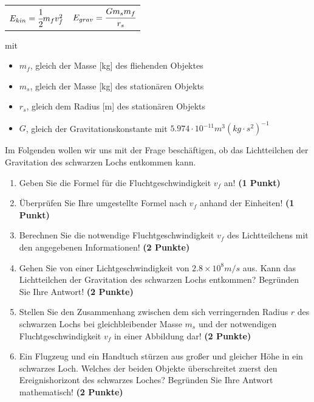\documentclass[a4paper, 9pt]{scrartcl}\usepackage[]{graphicx}\usepackage[]{xcolor}
\begin{document}
\begin{center}
  \begin{tabular}{cc}
    $E_{kin} = \cfrac{1}{2}m_fv_f^2$ & $E_{grav} = \cfrac{Gm_sm_f}{r_s}$\\
  \end{tabular}
\end{center}

mit

\begin{itemize}[noitemsep]
\item $m_f$, gleich der Masse [kg] des fliehenden Objektes
\item $m_s$, gleich der Masse [kg] des station{\"a}ren Objekts
\item $r_s$, gleich dem Radius [m] des station{\"a}ren Objekts  
\item $G$, gleich der Gravitationskonstante mit $5.974 \cdot 10^{-11}
  m^3(kg \cdot s^2)^{-1}$ 
\end{itemize}

Im Folgenden wollen wir uns mit der Frage besch{\"a}ftigen, ob das
Lichtteilchen der Gravitation des schwarzen Lochs entkommen kann.

\begin{enumerate}
\item Geben Sie die Formel f{\"u}r die Fluchtgeschwindigkeit $v_f$ an! 
  \textbf{(1 Punkt)}
\item {\"U}berpr{\"u}fen Sie Ihre umgestellte Formel nach $v_f$ anhand der Einheiten!
  \textbf{(1 Punkt)} 
\item Berechnen Sie die notwendige Fluchtgeschwindigkeit $v_f$ des
  Lichtteilchens mit den angegebenen Informationen! \textbf{(2 Punkte)}
\item Gehen Sie von einer Lichtgeschwindigkeit von $\ensuremath{2.8\times 10^{8}}m/s$
  aus. Kann das Lichtteilchen der Gravitation des schwarzen Lochs
  entkommen? Begr{\"u}nden Sie Ihre Antwort! \textbf{(2 Punkte)}
\item Stellen Sie den Zusammenhang zwischen dem sich verringernden Radius
  $r$ des schwarzen Lochs bei gleichbleibender Masse $m_s$
  und der notwendigen Fluchtgeschwindigkeit $v_f$ in einer Abbildung dar!
  \textbf{(2 Punkte)}
 \item Ein Flugzeug und ein Handtuch st{\"u}rzen aus gro{\ss}er und gleicher H{\"o}he
  in ein schwarzes Loch. Welches der beiden Objekte {\"u}berschreitet zuerst
  den Ereignishorizont des schwarzes Loches? Begr{\"u}nden
  Sie Ihre Antwort mathematisch! \textbf{(2 Punkte)}  
\end{enumerate}
\end{document}
